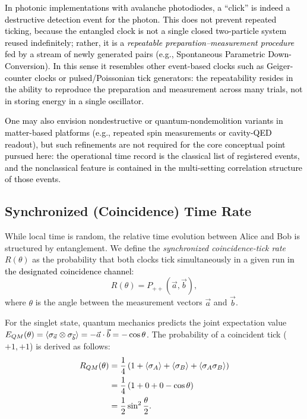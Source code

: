 \documentclass[reprint,aps,pra,longbibliography]{revtex4-2}
\newcommand{\rev}[1]{\textcolor{black}{#1}} %
\newcommand{\revG}[1]{\textcolor{black}{#1}} %
\begin{document}
\revG{In photonic implementations with avalanche photodiodes, a ``click'' is indeed a destructive detection event for the photon. This does not prevent repeated ticking, because the entangled clock is not a single closed two-particle system reused indefinitely; rather, it is a \emph{repeatable preparation--measurement procedure} fed by a stream of newly generated pairs (e.g., Spontaneous Parametric Down-Conversion). In this sense it resembles other event-based clocks such as Geiger-counter clocks or pulsed/Poissonian tick generators: the repeatability resides in the ability to reproduce the preparation and measurement across many trials, not in storing energy in a single oscillator.}

\revG{One may also envision nondestructive or quantum-nondemolition variants in matter-based platforms (e.g., repeated spin measurements or cavity-QED readout), but such refinements are not required for the core conceptual point pursued here: the operational time record is the classical list of registered events, and the nonclassical feature is contained in the multi-setting correlation structure of those events.}

\subsection{Synchronized (Coincidence) Time Rate}

While local time is random, the relative time evolution between Alice and Bob is structured by entanglement. We define the \emph{synchronized coincidence-tick rate} $R(\theta)$ as the probability that both clocks tick simultaneously in a given run \rev{in the designated coincidence channel}:
\begin{equation}
R(\theta) = P_{++}(\vec{a}, \vec{b}),
\end{equation}
where $\theta$ is the angle between the measurement vectors $\vec{a}$ and $\vec{b}$.

For the singlet state, quantum mechanics predicts the joint expectation value $E_{QM}(\theta) = \braket{\sigma_{\vec{a}} \otimes \sigma_{\vec{b}}} = -\vec{a}\cdot\vec{b} = -\cos\theta$. The probability of a coincident tick ($+1, +1$) is derived as follows:
\begin{align}
R_{QM}(\theta) &= \frac{1}{4} \left( 1 + \braket{\sigma_A} + \braket{\sigma_B} + \braket{\sigma_A \sigma_B} \right) \nonumber \\
&= \frac{1}{4} \left( 1 + 0 + 0 - \cos\theta \right) \nonumber \\
&= \frac{1}{2}\sin^2\frac{\theta}{2}.
\label{eq:qm_rate}
\end{align}
\end{document}

